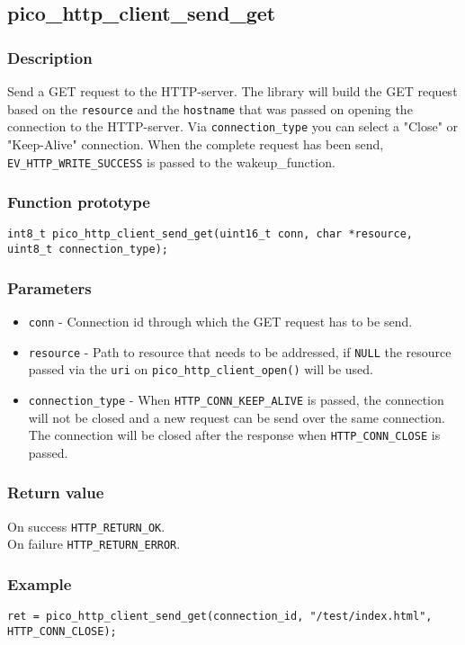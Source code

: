 \subsection{pico\_http\_client\_send\_get}
\subsubsection*{Description}
Send a GET request to the HTTP-server. The library will build the GET request based on the \texttt{resource} and the \texttt{hostname} that was passed on opening the connection to the HTTP-server. Via \texttt{connection\_type} you can select a "Close" or "Keep-Alive" connection. When the complete request has been send, \texttt{EV\_HTTP\_WRITE\_SUCCESS} is passed to the wakeup\_function.

\subsubsection*{Function prototype}
\texttt{int8\_t pico\_http\_client\_send\_get(uint16\_t conn, char *resource, uint8\_t connection\_type);}

\subsubsection*{Parameters}
\begin{itemize}[noitemsep]
\item \texttt{conn} - Connection id through which the GET request has to be send.
\item \texttt{resource} - Path to resource that needs to be addressed, if \texttt{NULL} the resource passed via the \texttt{uri} on \texttt{pico\_http\_client\_open()} will be used.
\item \texttt{connection\_type} - When \texttt{HTTP\_CONN\_KEEP\_ALIVE} is passed, the connection will not be closed and a new request can be send over the same connection. The connection will be closed after the response when \texttt{HTTP\_CONN\_CLOSE} is passed.
\end{itemize}

\subsubsection*{Return value}
On success \texttt{HTTP\_RETURN\_OK}.
\\On failure \texttt{HTTP\_RETURN\_ERROR}.

\subsubsection*{Example}
\begin{verbatim}
ret = pico_http_client_send_get(connection_id, "/test/index.html", HTTP_CONN_CLOSE);
\end{verbatim}

